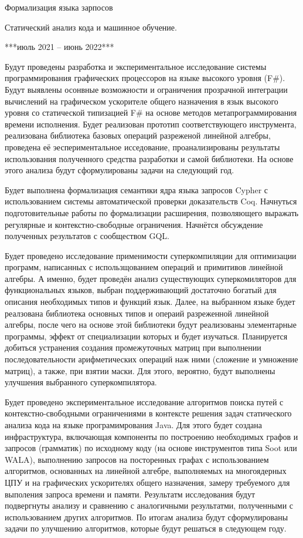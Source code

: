 \documentclass[12pt]{article}  %
\theoremstyle{remark}
\begin{document}
Формализация языка зарпосов

Статический анализ кода и машинное обучение.


***июль 2021 -- июнь 2022***

Будут проведены разработка и экспериментальное исследование системы программирования графических процессоров на языке высокого уровня (F\#). Будут выявлены осонвные возможности и ограничения прозрачной интеграции вычислений на графическом ускорителе общего назначения в язык высокого уровня со статической типизацией F\# на основе методов метапрограммирования времени исполнения. Будет реализован прототип соответствующего инструмента, реализована библиотека базовых операций разреженой линейной алгебры, проведена её эеспериментальное исседование, проанализированы результаты использования полученного средства разработки и самой библиотеки. На основе этого анализа будут сформулированы задачи на следующий год. 

Будет выполнена формализация семантики ядра языка запросов Cypher с использованием системы автоматической проверки доказательств Coq. Начнуться подготовительные работы по формализации расширения, позволяющего выражать регулярные и контекстно-свободные ограничения. Начнётся обсуждение полученных результатов с сообществом GQL.

Будет проведено исследование применимости суперкомпиляции для оптимизации программ, написанных с использщованием операций и примитивов линейной алгебры. А именно, будет проведён анализ существующих суперкомиляторов для функциональных языков, выбран поддерживающий достаточно богатый для описания необходимых типов и функций язык. Далее, на выбранном языке будет реалзована библиотека основных типов и операий разреженной линейной алгебры, после чего на основе этой библиотеки будут реализованы элементарные программы, эффект от специализации которых и будет изучаться. Планируется добиться устранения создания промежуточных матриц при выполнении последовательности арифметических операций наж ними (сложение и умножение матриц), а также, при взятии маски. Для этого, вероятно, будут выполнены улучшения выбранного суперкомпилятора.

Будет проведено экспериментальное исследование алгоритмов поиска путей с контекстно-свободными ограничениями в контексте решения задач статического анализа кода на языке програмимрования Java. Для этого будет создана инфраструктура, включающая компоненты по построению необходимых графов и запросов (грамматик) по исходному коду (на основе инструментов типа Soot или WALA), выполнению запросов на посторенных графах с использованием алгоритмов, основанных на линейной алгебре, выполняемых на многоядерных ЦПУ и на графических ускорителях общего назначения, замеру требуемого для выполения запроса времени и памяти. Результатм исследования будут подвергнуты анализу и сравнению с аналогичными результатми, полученными с использованием других алгоритмов. По итогам анализа будут сформулированы задачи по улучшению алгоритмов, которые будут решаться в следующем году.
\end{document}
